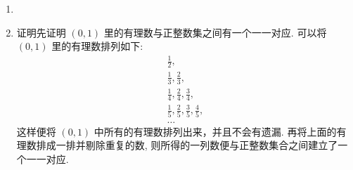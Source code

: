 \documentclass[a4paper, 11pt]{ctexart}
\begin{document}
\begin{enumerate}
        \item %
        \item %
            {\heiti 证明}\quad 先证明 $(0, 1)$ 里的有理数与正整数集之间有一个一一对应. 可以将 $(0, 1)$ 里的有理数排列如下:
            \begin{gather*}
                \frac12, \\
                \frac13, \frac23, \\
                \frac14, \frac24, \frac34, \\
                \frac15, \frac25, \frac35, \frac45, \\
                \dots
            \end{gather*}
            这样便将 $(0, 1)$ 中所有的有理数排列出来，并且不会有遗漏. 再将上面的有理数排成一排并剔除重复的数, 则所得的一列数便与正整数集合之间建立了一个一一对应.
        

\end{enumerate}
\end{document}
